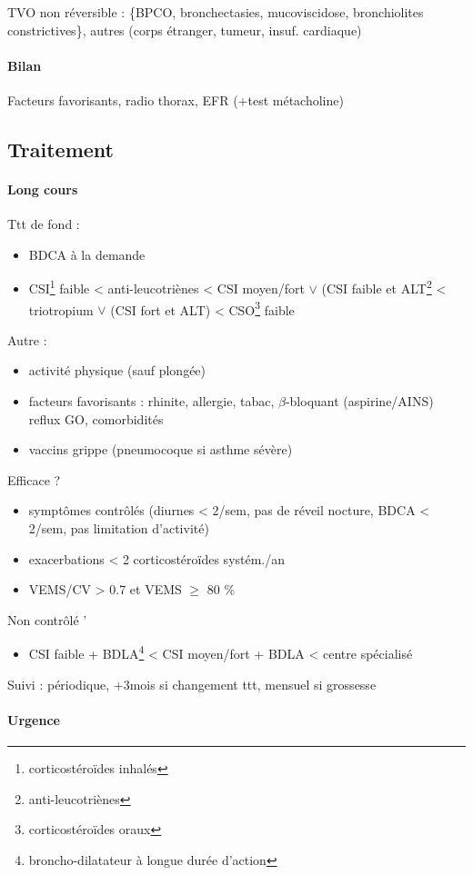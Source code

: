 TVO non réversible : \{BPCO, bronchectasies, mucoviscidose, bronchiolites
constrictives\}, autres (corps étranger, tumeur, insuf. cardiaque)
\paragraph{Bilan}
Facteurs favorisants, radio thorax, EFR (+test métacholine)

\subsection{Traitement}

\paragraph{Long cours}
Ttt de fond :
\begin{itemize}
\item BDCA à la demande
\item CSI\footnote{corticostéroïdes inhalés} faible < anti-leucotriènes < CSI moyen/fort
\(\vee\) (CSI faible et ALT\footnote{anti-leucotriènes} < triotropium \(\vee\) (CSI fort et
ALT) < CSO\footnote{corticostéroïdes oraux} faible
\end{itemize}
Autre : 
\begin{itemize}
\item activité physique (sauf plongée)
\item facteurs favorisants : rhinite, allergie, tabac, \(\beta\)-bloquant
(aspirine/AINS) reflux GO, comorbidités
\item vaccins grippe (pneumocoque si asthme sévère)
\end{itemize}
Efficace ?
\begin{itemize}
\item symptômes contrôlés (diurnes < 2/sem, pas de réveil nocture, BDCA < 2/sem, pas
limitation d'activité)
\item exacerbations < 2 corticostéroïdes systém./an
\item VEMS/CV > 0.7 et VEMS \(\ge\) 80 \%
\end{itemize}
Non contrôlé '
\begin{itemize}
\item CSI faible + BDLA\footnote{broncho-dilatateur à longue durée d'action} < CSI
moyen/fort + BDLA < centre spécialisé
\end{itemize}
Suivi : périodique, +3mois si changement ttt, mensuel si grossesse

\paragraph{Urgence}

